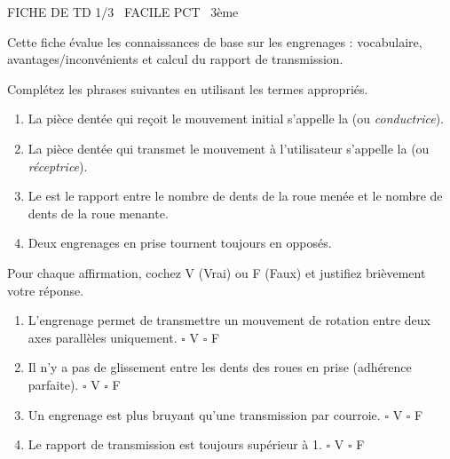 \documentclass[11pt]{article}
\begin{document}
\begin{tcolorbox}[enhanced,colback=popink,colframe=popink,arc=10pt,boxrule=0pt,left=12pt,right=12pt,top=9pt,bottom=9pt]
{\color{white}\popxbold\small FICHE DE TD 1/3 \textbullet\ FACILE \hfill PCT \textbullet\ 3ème\par}
\end{tcolorbox}
\vspace{4pt}
Cette fiche évalue les connaissances de base sur les engrenages : vocabulaire, avantages/inconvénients et calcul du rapport de transmission.

\begin{exercice}
Complétez les phrases suivantes en utilisant les termes appropriés.
\begin{enumerate}
    \item La pièce dentée qui reçoit le mouvement initial s'appelle la \makebox[3cm]{\dotfill} (ou \emph{conductrice}).
    \item La pièce dentée qui transmet le mouvement à l'utilisateur s'appelle la \makebox[3cm]{\dotfill} (ou \emph{réceptrice}).
    \item Le \makebox[3cm]{\dotfill} est le rapport entre le nombre de dents de la roue menée et le nombre de dents de la roue menante.
    \item Deux engrenages en prise tournent toujours en \makebox[3cm]{\dotfill} opposés.
\end{enumerate}
\end{exercice}

\begin{exercice}
Pour chaque affirmation, cochez V (Vrai) ou F (Faux) et justifiez brièvement votre réponse.
\begin{enumerate}
    \item L'engrenage permet de transmettre un mouvement de rotation entre deux axes parallèles uniquement. \hfill $\square$ V \quad $\square$ F
    \item Il n'y a pas de glissement entre les dents des roues en prise (adhérence parfaite). \hfill $\square$ V \quad $\square$ F
    \item Un engrenage est plus bruyant qu'une transmission par courroie. \hfill $\square$ V \quad $\square$ F
    \item Le rapport de transmission est toujours supérieur à 1. \hfill $\square$ V \quad $\square$ F
\end{enumerate}
\end{exercice}
\end{document}
